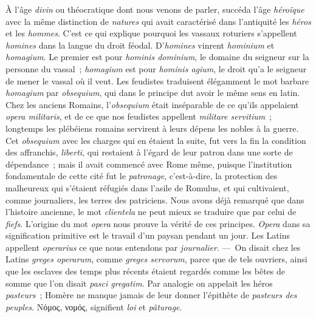 \documentclass[french,twoside]{book} %
\newcommand\chaptercont{} %
\begin{document}
\chaptercont
\noindent  À l’âge {\itshape divin} ou théocratique dont nous venons de parler, succéda l’âge {\itshape héroïque} avec la même distinction de {\itshape natures} qui avait caractérisé dans l’antiquité les {\itshape héros} et les {\itshape hommes}. C’est ce qui explique pourquoi les vassaux roturiers s’appellent {\itshape homines} dans la langue du droit féodal. D’{\itshape homines} vinrent {\itshape hominium} et {\itshape homagium}. Le premier est pour {\itshape hominis dominium}, le domaine du seigneur sur la personne du vassal ; {\itshape homagium} est pour {\itshape hominis agium}, le droit qu’a le seigneur de mener le vassal où il veut. Les feudistes traduisent élégamment le mot barbare {\itshape homagium} par {\itshape obsequium}, qui dans le principe dut avoir le même sens en latin. Chez les anciens Romains, l’{\itshape obsequium} était inséparable de ce qu’ils appelaient {\itshape opera militaris}, et de ce que nos feudistes appellent {\itshape militare servitium} ; longtemps les plébéiens romains servirent à  leurs dépens les nobles à la guerre. Cet {\itshape obsequium} avec les charges qui en étaient la suite, fut vers la fin la condition des affranchis, {\itshape liberti}, qui restaient à l’égard de leur patron dans une sorte de dépendance ; mais il avait commencé avec Rome même, puisque l’institution fondamentale de cette cité fut le {\itshape patronage}, c’est-à-dire, la protection des malheureux qui s’étaient réfugiés dans l’asile de Romulus, et qui cultivaient, comme journaliers, les terres des patriciens. Nous avons déjà remarqué que dans l’histoire ancienne, le mot {\itshape clientela} ne peut mieux se traduire que par celui de {\itshape fiefs}. L’origine du mot {\itshape opera} nous prouve la vérité de ces principes. {\itshape Opera} dans sa signification primitive est le travail d’un paysan pendant un jour. Les Latins appellent {\itshape operarius} ce que nous entendons par {\itshape journalier}. — On disait chez les Latins {\itshape greges operarum}, comme {\itshape greges servorum}, parce que de tels ouvriers, ainsi que les esclaves des temps plus récents étaient regardés comme les bêtes de somme que l’on disait {\itshape pasci gregatim}. Par analogie on appelait les héros {\itshape pasteurs} ; Homère ne manque jamais de leur donner l’épithète de {\itshape pasteurs des peuples}. Νόμος, νομός, signifient {\itshape loi} et {\itshape pâturage}.\par
\end{document}
